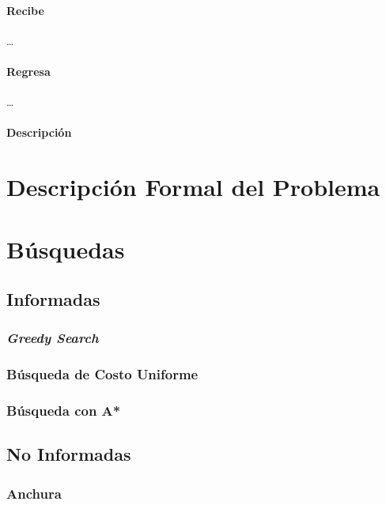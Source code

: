 \documentclass[12pt, letterpaper]{article}
\begin{document}
            \paragraph{Recibe}
            \dots
            \paragraph{Regresa}
            \dots
            \paragraph{Descripción}

\section{Descripción Formal del Problema}

\section{Búsquedas}

    \subsection{Informadas}

        \subsubsection{\textit{Greedy Search}}

        \subsubsection{Búsqueda de Costo Uniforme}

        \subsubsection{Búsqueda con A*}

    \subsection{No Informadas}

        \subsubsection{Anchura}
\end{document}
